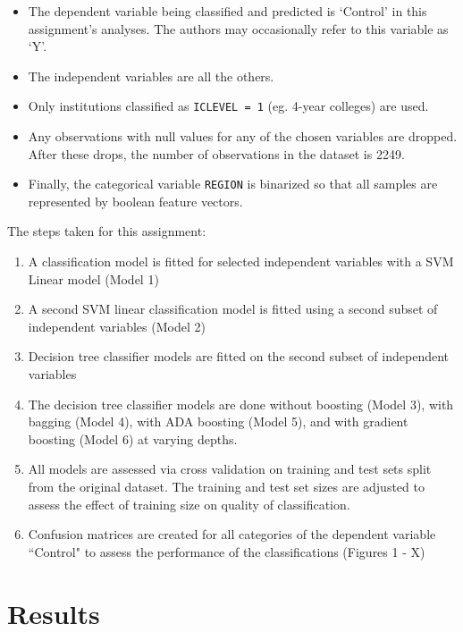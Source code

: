 \documentclass[10pt,twocolumn]{article}
\begin{document}
\begin{itemize}
\item The dependent variable being classified and predicted is `Control' in this assignment's
analyses. The authors may occasionally refer to this variable as `Y'.
\item The independent variables are all the others.
\item Only institutions classified as \texttt{ICLEVEL = 1} (eg. 4-year colleges) are used.
\item Any observations with null values for any of the chosen variables
are dropped. After these drops, the number of observations
in the dataset is 2249.
\item Finally, the categorical variable \texttt{REGION} is binarized so that all samples
are represented by boolean feature vectors.
\end{itemize}

The steps taken for this assignment:

\begin{enumerate}
\item A classification model is fitted for selected independent variables with
a SVM Linear model (Model 1)
\item A second SVM linear classification model is fitted using a second subset
of independent variables (Model 2)
\item Decision tree classifier models are fitted on the second subset of independent variables
\item The decision tree classifier models are done without boosting (Model 3), with bagging (Model 4),
with ADA boosting (Model 5), and with gradient boosting (Model 6) at varying depths.
\item All models are assessed via cross validation on training and test sets split
from the original dataset. The training and test set sizes are adjusted to assess the effect of training size on quality
of classification.
\item Confusion matrices are created for all categories of the dependent variable
``Control" to assess the performance of the classifications (Figures 1 - X)
\end{enumerate}

\section{Results}
\end{document}
